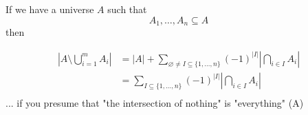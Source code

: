 If we have a universe $A$ such that
\[
    A_1,\ldots,A_n \subseteq A
\]then

\begin{align*}
|A\setminus \bigcup\limits_{i=1}^m A_i| &=
|A| +
    \sum_{\varnothing\neq I\subseteq\{1,\ldots,n\}}
        (-1)^{|I|}
        \left| \bigcap_{i\in I} A_i \right| \\
&=
\sum_{I\subseteq\{1,\ldots,n\}}
    (-1)^{|I|}
    \left| \bigcap_{i\in I} A_i \right| \\
\end{align*}
... if you presume that "the intersection of nothing" is "everything" (A)






























